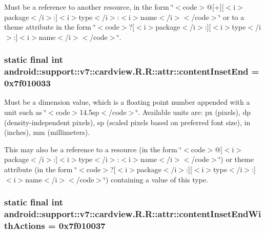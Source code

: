 Must be a reference to another resource, in the form \char`\"{}$<$code$>$@\mbox{[}+\mbox{]}\mbox{[}$<$i$>$package$<$/i$>$:\mbox{]}$<$i$>$type$<$/i$>$:$<$i$>$name$<$/i$>$$<$/code$>$\char`\"{} or to a theme attribute in the form \char`\"{}$<$code$>$?\mbox{[}$<$i$>$package$<$/i$>$:\mbox{]}\mbox{[}$<$i$>$type$<$/i$>$:\mbox{]}$<$i$>$name$<$/i$>$$<$/code$>$\char`\"{}. \hypertarget{classandroid_1_1support_1_1v7_1_1cardview_1_1_r_1_1attr_87d6b305f9f8edf14864f95c1bfc5ee5}{
\subsubsection[{contentInsetEnd}]{\setlength{\rightskip}{0pt plus 5cm}static final int android::support::v7::cardview.R.R::attr::contentInsetEnd = 0x7f010033}}
\label{classandroid_1_1support_1_1v7_1_1cardview_1_1_r_1_1attr_87d6b305f9f8edf14864f95c1bfc5ee5}


Must be a dimension value, which is a floating point number appended with a unit such as \char`\"{}$<$code$>$14.5sp$<$/code$>$\char`\"{}. Available units are: px (pixels), dp (density-independent pixels), sp (scaled pixels based on preferred font size), in (inches), mm (millimeters). 

This may also be a reference to a resource (in the form \char`\"{}$<$code$>$@\mbox{[}$<$i$>$package$<$/i$>$:\mbox{]}$<$i$>$type$<$/i$>$:$<$i$>$name$<$/i$>$$<$/code$>$\char`\"{}) or theme attribute (in the form \char`\"{}$<$code$>$?\mbox{[}$<$i$>$package$<$/i$>$:\mbox{]}\mbox{[}$<$i$>$type$<$/i$>$:\mbox{]}$<$i$>$name$<$/i$>$$<$/code$>$\char`\"{}) containing a value of this type. \hypertarget{classandroid_1_1support_1_1v7_1_1cardview_1_1_r_1_1attr_834d70596f8dc323caf0ae9a298c2bb5}{
\subsubsection[{contentInsetEndWithActions}]{\setlength{\rightskip}{0pt plus 5cm}static final int android::support::v7::cardview.R.R::attr::contentInsetEndWithActions = 0x7f010037}}
\label{classandroid_1_1support_1_1v7_1_1cardview_1_1_r_1_1attr_834d70596f8dc323caf0ae9a298c2bb5}


